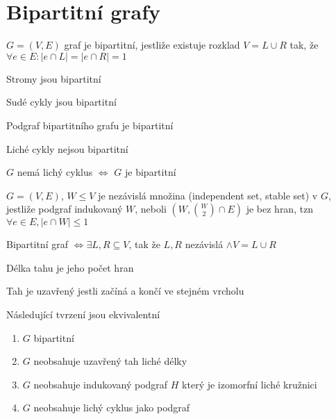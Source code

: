 \documentclass[../main.tex]{subfiles}
\begin{document}
\section{Bipartitní grafy}

\begin{definition}
    $G=(V,E)$ graf je bipartitní, jestliže existuje rozklad $V=L \cup R$ tak, že $\forall e \in E : |e\cap L| = |e \cap R| = 1$
\end{definition}

\begin{remark}
    Stromy jsou bipartitní 
\end{remark}

\begin{remark}
    Sudé cykly jsou bipartitní
\end{remark}

\begin{remark}
    Podgraf bipartitního grafu je bipartitní
\end{remark}

\begin{remark}
    Liché cykly nejsou bipartitní
\end{remark}

\begin{theorem}
    $G$ nemá lichý cyklus $\Leftrightarrow$ $G$ je bipartitní
\end{theorem}

\begin{definition}
    $G=(V,E)$, $W\leq V$ je nezávislá množina (independent set, stable set) v $G$, jestliže podgraf indukovaný $W$, neboli $(W, \binom{W}{2} \cap E)$ je bez hran,
    tzn $\forall e \in E, |e\cap W| \leq 1$
\end{definition}

\begin{theorem}
    Bipartitní graf $\Leftrightarrow \exists L, R \subseteq V$, tak že $L,R$ nezávislá $\wedge V = L\cup R $ 
\end{theorem}

\begin{definition}
    Délka tahu je jeho počet hran
\end{definition}

\begin{definition}
    Tah je uzavřený jestli začíná a končí ve stejném vrcholu
\end{definition}


\begin{theorem}
    Následující tvrzení jsou ekvivalentní
    \begin{enumerate}
        \item $G$ bipartitní
        \item $G$ neobsahuje uzavřený tah liché délky
        \item $G$ neobsahuje indukovaný podgraf $H$ který je izomorfní liché kružnici
        \item $G$ neobsahuje lichý cyklus jako podgraf
    \end{enumerate}
\end{theorem}
\end{document}
